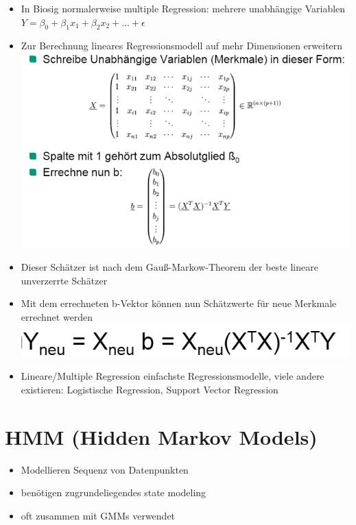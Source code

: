 \documentclass[a4paper,10pt,oneside]{article}
\begin{document}
\begin{itemize}
	\item In Biosig normalerweise multiple Regression: mehrere unabhängige Variablen $Y=\beta_0+\beta_1x_1+\beta_2x_2+...+\epsilon$
	\item Zur Berechnung lineares Regressionsmodell auf mehr Dimensionen erweitern
	\includegraphics[scale=0.65]{Grafiken/multipreg.png}
	\item Dieser Schätzer ist nach dem Gauß-Markow-Theorem der beste lineare unverzerrte Schätzer
	\item Mit dem errechneten b-Vektor können nun Schätzwerte für neue Merkmale errechnet werden 
	\includegraphics[scale=0.65]{Grafiken/neuemerkmale.png}
	\item Lineare/Multiple Regression einfachste Regressionsmodelle, viele andere existieren: Logistische Regression, Support Vector Regression
\end{itemize}








\section{HMM (Hidden Markov Models)}
	\begin{itemize}
		\item Modellieren Sequenz von Datenpunkten
		\item benötigen zugrundeliegendes state modeling
		\item oft zusammen mit GMMs verwendet
	\end{itemize}
	
\end{document}
